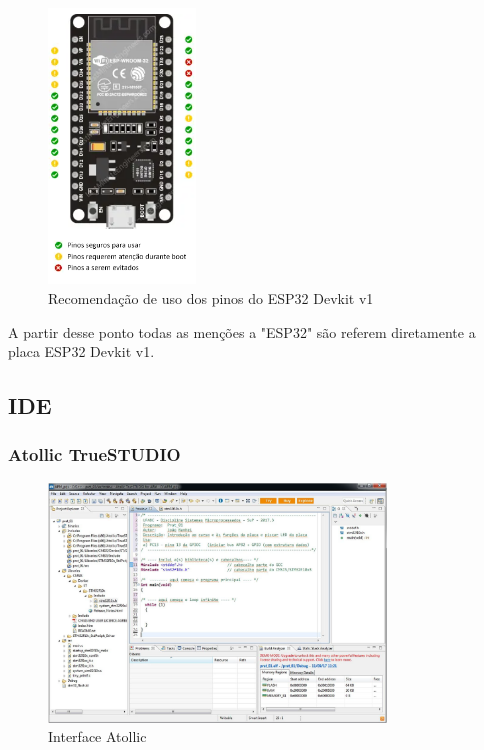 \begin{figure}[ht]
	\centering
	\includegraphics[width=0.35\textwidth]{figures/esp32_pinout_ref}
	\caption{Recomendação de uso dos pinos do ESP32 Devkit v1 \cite{esp32_reference}}
	\label{esp32_pinout_ref}
\end{figure}

A partir desse ponto todas as menções a "ESP32" são referem diretamente a placa ESP32 Devkit v1.


\subsection{IDE}

\subsubsection{Atollic TrueSTUDIO}

\begin{figure}[ht]
	\centering
	\includegraphics[width=0.8\textwidth]{figures/atollic}
	\caption{Interface Atollic \cite{apostila_microprossados}}
\end{figure}

